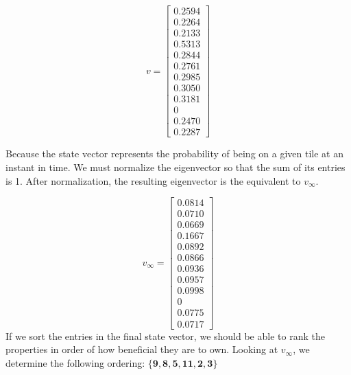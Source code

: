 \documentclass[fleqn]{article}
\begin{document}
\begin{enumerate}[nolistsep]
\begin{enumerate}
			\begin{equation*}
				v = \begin{bmatrix}
					0.2594 \\ 
					0.2264 \\
					0.2133 \\
					0.5313 \\
					0.2844 \\
					0.2761 \\
					0.2985 \\
					0.3050 \\
					0.3181 \\
					0 \\
					0.2470\\
					0.2287
				\end{bmatrix}
			\end{equation*}
			
			Because the state vector represents the probability of being on a given tile at an instant in time. We must normalize the eigenvector so that the sum of its entries is 1. After normalization, the resulting eigenvector is the equivalent to $v_{\infty}$.
			
			 \begin{equation*}
			 	v_{\infty} = \begin{bmatrix}
			 		0.0814 \\
			 		0.0710 \\
			 		0.0669 \\
			 		0.1667 \\
			 		0.0892 \\
			 		0.0866 \\
			 		0.0936 \\
			 		0.0957 \\
			 		0.0998 \\
			 		0 \\
			 		0.0775 \\
			 		0.0717
			 	\end{bmatrix}
			 \end{equation*}			
			 If we sort the entries in the final state vector, we should be able to rank the properties in order of how beneficial they are to own. Looking at $v_{\infty}$, we determine the following ordering: $\mathbf{\{9, 8, 5, 11, 2, 3\}}$
		\end{enumerate}
	\end{enumerate}
\end{document}
